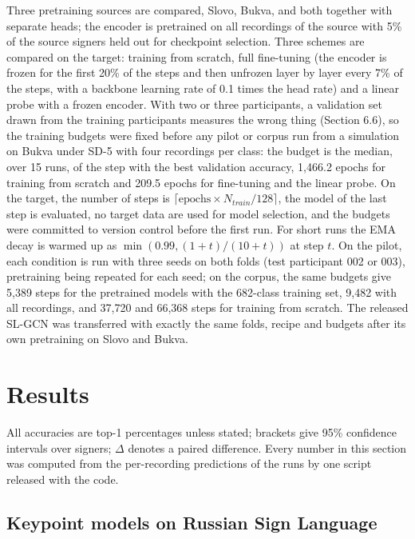 Three pretraining sources are compared, Slovo, Bukva, and both together with separate heads; the encoder is pretrained on all recordings of the source with 5\% of the source signers held out for checkpoint selection. Three schemes are compared on the target: training from scratch, full fine-tuning (the encoder is frozen for the first 20\% of the steps and then unfrozen layer by layer every 7\% of the steps, with a backbone learning rate of 0.1 times the head rate) and a linear probe with a frozen encoder. With two or three participants, a validation set drawn from the training participants measures the wrong thing (Section 6.6), so the training budgets were fixed before any pilot or corpus run from a simulation on Bukva under SD-5 with four recordings per class: the budget is the median, over 15 runs, of the step with the best validation accuracy, 1,466.2 epochs for training from scratch and 209.5 epochs for fine-tuning and the linear probe. On the target, the number of steps is \(\lceil \text{epochs} \times N_{train}/128 \rceil\), the model of the last step is evaluated, no target data are used for model selection, and the budgets were committed to version control before the first run. For short runs the EMA decay is warmed up as \(\min(0.99, (1+t)/(10+t))\) at step \(t\). On the pilot, each condition is run with three seeds on both folds (test participant 002 or 003), pretraining being repeated for each seed; on the corpus, the same budgets give 5,389 steps for the pretrained models with the 682-class training set, 9,482 with all recordings, and 37,720 and 66,368 steps for training from scratch. The released SL-GCN was transferred with exactly the same folds, recipe and budgets after its own pretraining on Slovo and Bukva.

\hypertarget{results}{%
\section{Results}\label{results}}

All accuracies are top-1 percentages unless stated; brackets give 95\% confidence intervals over signers; \(\Delta\) denotes a paired difference. Every number in this section was computed from the per-recording predictions of the runs by one script released with the code.

\hypertarget{keypoint-models-on-russian-sign-language}{%
\subsection{Keypoint models on Russian Sign Language}\label{keypoint-models-on-russian-sign-language}}

